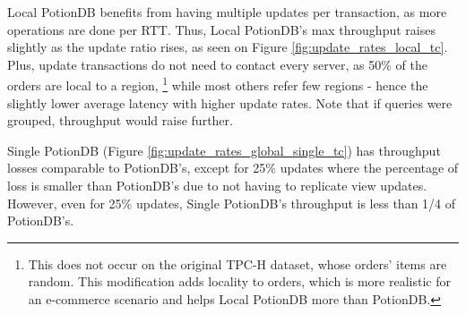 \documentclass[sigplan,review,anonymous]{acmart}
\begin{document}
Local PotionDB benefits from having multiple updates per transaction, as more operations are done per RTT.
Thus, Local PotionDB's max throughput raises slightly as the update ratio rises, as seen on Figure \ref{fig:update_rates_local_tc}.
Plus, update transactions do not need to contact every server, as 50\% of the orders are local to a region, \footnote{This does not occur on the original TPC-H dataset, whose orders' items are random. This modification adds locality to orders, which is more realistic for an e-commerce scenario and helps Local PotionDB more than PotionDB.
} while most others refer few regions - hence the slightly lower average latency with higher update rates.
Note that if queries were grouped, throughput would raise further.

Single PotionDB (Figure \ref{fig:update_rates_global_single_tc}) has throughput losses comparable to PotionDB's, except for 25\% updates where the percentage of loss is smaller than PotionDB's due to not having to replicate view updates.
However, even for 25\% updates, Single PotionDB's throughput is less than 1/4 of PotionDB's.
\end{document}
